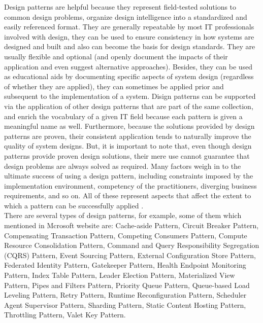 \documentclass[10pt, conference]{IEEEtran}
\begin{document}
\indent Design patterns are helpful because they represent field-tested solutions to common design problems, organize design intelligence into a standardized and easily referenced format. They are generally repeatable by most IT professionals involved with design, they can be used to ensure consistency in how systems are designed and built and also can become the basis for design standards. They are usually flexible and optional (and openly document the impacts of their application and even suggest alternative approaches). Besides, they can be used as educational aids by documenting specific aspects of system design (regardless of whether they are applied), they can sometimes be applied prior and subsequent to the implementation of a system. Disign patterns can be supported via the application of other design patterns that are part of the same collection, and enrich the vocabulary of a given IT field because each pattern is given a meaningful name as well. Furthermore, because the solutions provided by design patterns are proven, their consistent application tends to naturally improve the quality of system designs. But, it is important to note that, even though design patterns provide proven design solutions, their mere use cannot guarantee that design problems are always solved as required. Many factors weigh in to the ultimate success of using a design pattern, including constraints imposed by the implementation environment, competency of the practitioners, diverging business requirements, and so on. All of these represent aspects that affect the extent to which a pattern can be successfully applied \cite{ref2}. \\
\indent There are several types of design patterns, for example, some of them which mentioned in Mcrosoft website \cite{ref3} are: Cache-aside Pattern, Circuit Breaker Pattern, Compensating Transaction Pattern, Competing Consumers Pattern, Compute Resource Consolidation Pattern, Command and Query Responsibility Segregation (CQRS) Pattern, Event Sourcing Pattern, External Configuration Store Pattern, Federated Identity Pattern, Gatekeeper Pattern, Health Endpoint Monitoring Pattern, Index Table Pattern, Leader Election Pattern, Materialized View Pattern, Pipes and Filters Pattern, Priority Queue Pattern, Queue-based Load Leveling Pattern, Retry Pattern, Runtime Reconfiguration Pattern, Scheduler Agent Supervisor Pattern, Sharding Pattern, Static Content Hosting Pattern, Throttling Pattern, Valet Key Pattern.
 
\end{document}
